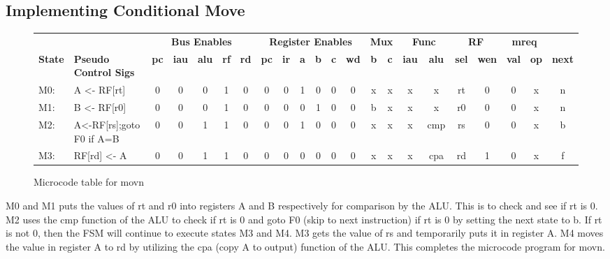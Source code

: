 \documentclass[10pt]{article}
\begin{document}
\subsection{Implementing Conditional Move}
\begin{figure}[H]
\centering
{\setlength{\tabcolsep}{2pt}
\begin{tabular}{@{\extracolsep{3pt}}llcccccccccccccccccccc@{}}
\hline
& & \multicolumn{5}{c}{\textbf{Bus Enables}}
& \multicolumn{6}{c}{\textbf{Register Enables}}
& \multicolumn{2}{c}{\textbf{Mux}}
& \multicolumn{2}{c}{\textbf{Func}}
& \multicolumn{2}{c}{\textbf{RF}}
& \multicolumn{2}{c}{\textbf{mreq}}\\
\cline{3-7} 
\cline{8-13}
\cline{14-15}
\cline{16-17}
\cline{18-19}
\cline{20-21} 
\textbf{State} & \textbf{Pseudo Control Sigs} & \textbf{pc} & \textbf{iau} & \textbf{alu} & \textbf{rf} & \textbf{rd} & \textbf{pc} & \textbf{ir} & \textbf{a} & \textbf{b} & \textbf{c} & \textbf{wd} & \textbf{b} & \textbf{c} & \textbf{iau} & \textbf{alu} & \textbf{sel} & \textbf{wen} & \textbf{val} & \textbf{op} & \textbf{next} \\
\hline
M0: & A <- RF[rt] &0&0&0&1&0&0&0&1&0&0&0&x&x&x&x&rt&0&0&x&n \\
\hline
M1: & B <- RF[r0] &0&0&0&1&0&0&0&0&1&0&0&b&x&x&x&r0&0&0&x&n\\
\hline
M2: & A<-RF[rs];goto F0 if A=B &0&0&1&1&0&0&0&1&0&0&0&x&x&x&cmp&rs&0&0&x&b\\
\hline
M3: & RF[rd] <- A &0&0&1&1&0&0&0&0&0&0&0&x&x&x&cpa&rd&1&0&x&f\\
\hline
\end{tabular}
}
\caption{Microcode table for movn}
\label{fig:conditional_move}
\end{figure}
M0 and M1 puts the values of rt and r0 into registers A and B respectively for comparison by the ALU. This is to check and see if rt is 0. M2 uses the cmp function of the ALU to check if rt is 0 and goto F0 (skip to next instruction) if rt is 0 by setting the next state to b. If rt is not 0, then the FSM will continue to execute states M3 and M4. M3 gets the value of rs and temporarily puts it in register A. M4 moves the value in register A to rd by utilizing the cpa (copy A to output) function of the ALU. This completes the microcode program for movn.
\end{document}
